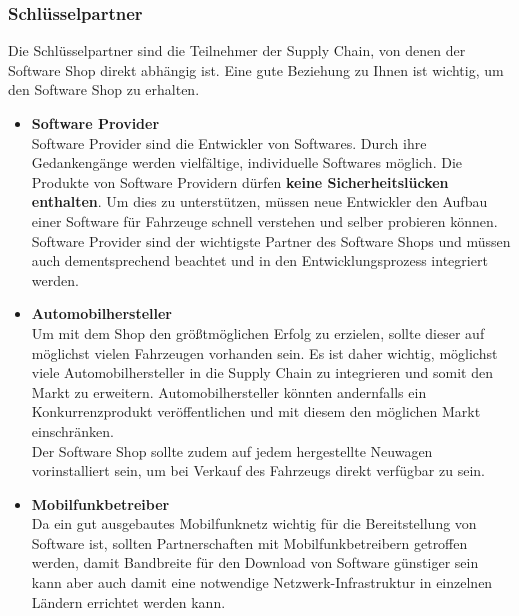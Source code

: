 \subsubsection{Schlüsselpartner}
Die Schlüsselpartner sind die Teilnehmer der Supply Chain, von denen der Software Shop direkt abhängig ist. Eine gute Beziehung zu Ihnen ist wichtig, um den Software Shop zu erhalten.
\begin{itemize}
	\item \textbf{Software Provider}\\
	Software Provider sind die Entwickler von Softwares. Durch ihre Gedankengänge werden vielfältige, individuelle Softwares möglich. Die Produkte von Software Providern dürfen \textbf{keine Sicherheitslücken enthalten}. Um dies zu unterstützen, müssen neue Entwickler den Aufbau einer Software für Fahrzeuge schnell verstehen und selber probieren können. Software Provider sind der wichtigste Partner des Software Shops und müssen auch dementsprechend beachtet und in den Entwicklungsprozess integriert werden.\\
	
	\item \textbf{Automobilhersteller}\\
	Um mit dem Shop den größtmöglichen Erfolg zu erzielen, sollte dieser auf möglichst vielen Fahrzeugen vorhanden sein. Es ist daher wichtig, möglichst viele Automobilhersteller in die Supply Chain zu integrieren und somit den Markt zu erweitern. Automobilhersteller könnten andernfalls ein Konkurrenzprodukt veröffentlichen und mit diesem den möglichen Markt einschränken.\\
	Der Software Shop sollte zudem auf jedem hergestellte Neuwagen vorinstalliert sein, um bei Verkauf des Fahrzeugs direkt verfügbar zu sein.
	
	\item \textbf{Mobilfunkbetreiber}\\
	Da ein gut ausgebautes Mobilfunknetz wichtig für die Bereitstellung von Software ist, sollten Partnerschaften mit Mobilfunkbetreibern getroffen werden, damit Bandbreite für den Download von Software günstiger sein kann aber auch damit eine notwendige Netzwerk-Infrastruktur in einzelnen Ländern errichtet werden kann.
	
\end{itemize}

